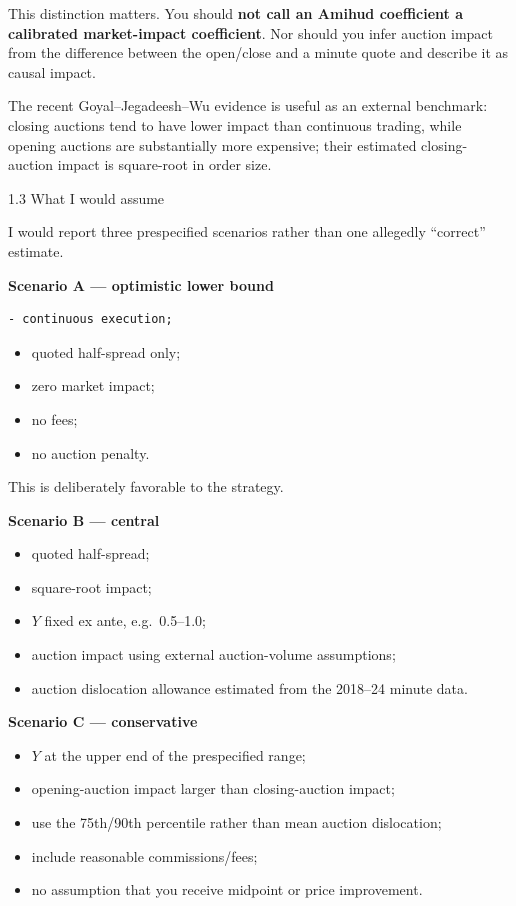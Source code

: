 This distinction matters. You should \textbf{not call an Amihud coefficient a calibrated market-impact coefficient}. Nor should you infer auction impact from the difference between the open/close and a minute quote and describe it as causal impact.

The recent Goyal--Jegadeesh--Wu evidence is useful as an external benchmark: closing auctions tend to have lower impact than continuous trading, while opening auctions are substantially more expensive; their estimated closing-auction impact is square-root in order size.

1.3 What I would assume

I would report three prespecified scenarios rather than one allegedly ``correct'' estimate.

\textbf{Scenario A --- optimistic lower bound}

\begin{verbatim}
- continuous execution;
\end{verbatim}

\begin{itemize}
\tightlist
\item
  quoted half-spread only;
\item
  zero market impact;
\item
  no fees;
\item
  no auction penalty.
\end{itemize}

This is deliberately favorable to the strategy.

\textbf{Scenario B --- central}

\begin{itemize}
\tightlist
\item
  quoted half-spread;
\item
  square-root impact;
\item
  \(Y\) fixed ex ante, e.g.~0.5--1.0;
\item
  auction impact using external auction-volume assumptions;
\item
  auction dislocation allowance estimated from the 2018--24 minute data.
\end{itemize}

\textbf{Scenario C --- conservative}

\begin{itemize}
\tightlist
\item
  \(Y\) at the upper end of the prespecified range;
\item
  opening-auction impact larger than closing-auction impact;
\item
  use the 75th/90th percentile rather than mean auction dislocation;
\item
  include reasonable commissions/fees;
\item
  no assumption that you receive midpoint or price improvement.
\end{itemize}

